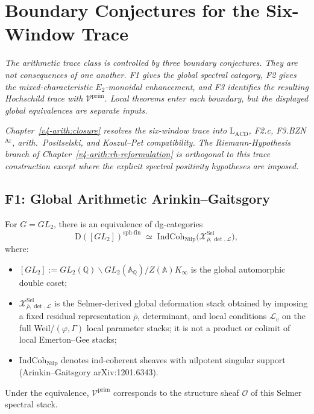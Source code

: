 \chapter{Boundary Conjectures for the Six-Window Trace}
\label{v4-arith:open-frontiers}

\emph{The arithmetic trace class is controlled by three boundary
conjectures. They are not consequences of one another. F1 gives the
global spectral category, F2 gives the mixed-characteristic
\(E_{2}\)-monoidal enhancement, and F3 identifies the resulting
Hochschild trace with \(\mathcal{V}^{\mathrm{prim}}\). Local theorems
enter each boundary, but the displayed global equivalences are separate
inputs.}

\emph{Chapter~\ref{v4-arith:closure} resolves the six-window trace into
\(\mathrm{L}_{\mathrm{ACD}}\), F2.c, F3.BZN\(^{\mathrm{Ar}}\),
arith.~Positselski, and Koszul--Pet compatibility. The
Riemann-Hypothesis branch of Chapter~\ref{v4-arith:rh-reformulation}
is orthogonal to this trace construction except where the explicit
spectral positivity hypotheses are imposed.}

\section{F1: Global Arithmetic Arinkin--Gaitsgory}
\label{v4-arith:of:F1}

\begin{conjecture}
\label{v4-arith:conj:F1-global-AG}
For \(G=GL_{2}\), there is an equivalence of dg-categories
\begin{equation}
\mathrm{D}([GL_{2}])^{\mathrm{sph\text{-}fin}}\;\simeq\;\mathrm{IndCoh}_{\mathrm{Nilp}}\bigl(\mathcal{X}^{\mathrm{Sel}}_{\bar\rho,\det,\mathcal{L}}\bigr),
\end{equation}
where:
\begin{itemize}
\item \([GL_{2}]:=GL_{2}(\mathbb{Q})\backslash GL_{2}(\mathbb{A}_{\mathbb{Q}})/Z(\mathbb{A})K_{\infty}\)
is the global automorphic double coset;
\item \(\mathcal{X}^{\mathrm{Sel}}_{\bar\rho,\det,\mathcal{L}}\) is
the Selmer-derived global deformation stack obtained by imposing a
fixed residual representation \(\bar\rho\), determinant, and local
conditions \(\mathcal{L}_{v}\) on the full Weil/\((\varphi,\Gamma)\)
local parameter stacks; it is not a product or colimit of local
Emerton--Gee stacks;
\item \(\mathrm{IndCoh}_{\mathrm{Nilp}}\) denotes ind-coherent sheaves
with nilpotent singular support (Arinkin--Gaitsgory arXiv:1201.6343).
\end{itemize}
Under the equivalence, \(\mathcal{V}^{\mathrm{prim}}\) corresponds to
the structure sheaf \(\mathcal{O}\) of this Selmer spectral stack.
\end{conjecture}

